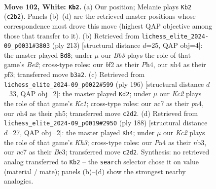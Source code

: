\documentclass[11pt]{article}
\begin{document}
\clearpage

\begin{figure}[p]\centering
\begin{subfigure}{0.46\textwidth}\centering
\resizebox{\linewidth}{!}{%
\newchessgame
\chessboard[
  setfen={8/1Nn3k1/8/8/Pp2P2n/1B6/2K1pb1p/8 w - - 0 102},
  showmover=false,
  pgfstyle=straightmove, color=movearrow, markmove={c2-b2}
]}
\caption{}
\end{subfigure}\hfill
\begin{subfigure}{0.46\textwidth}\centering
\resizebox{\linewidth}{!}{%
\newchessgame
\chessboard[
  setfen={8/4b3/3k4/p3p3/P3P2p/3N1P2/8/6K1 b - - 17 107},
  showmover=false,
  pgfstyle=straightmove, color=movearrow, markmove={e7-d8}
]}
\caption{}
\end{subfigure}
\\[4pt]
\begin{subfigure}{0.46\textwidth}\centering
\resizebox{\linewidth}{!}{%
\newchessgame
\chessboard[
  setfen={8/4B3/b7/3k3p/p6P/P2p4/8/2K5 w - - 28 99},
  showmover=false,
  pgfstyle=straightmove, color=movearrow, markmove={c1-d2}
]}
\caption{}
\end{subfigure}\hfill
\begin{subfigure}{0.46\textwidth}\centering
\resizebox{\linewidth}{!}{%
\newchessgame
\chessboard[
  setfen={5k2/8/7p/5p2/2P1nP2/1n2B2K/8/8 w - - 0 95},
  showmover=false,
  pgfstyle=straightmove, color=movearrow, markmove={h3-h4}
]}
\caption{}
\end{subfigure}
\caption{\textbf{Move 102, White: \texttt{Kb2}.} (a) Our position; Melanie plays \texttt{Kb2} (\texttt{c2b2}). Panels (b)--(d) are the retrieved master positions whose correspondence most drove this move (highest QAP objective among those that transfer to it). (b) Retrieved from \texttt{lichess\_elite\_2024-09\_p0031\#3803} (ply 213) [structural distance $d$=25, QAP obj=4]: the master played \texttt{Bd8}; under $\mu$ our \emph{Bb3} plays the role of that game's \emph{Be2}; cross-type roles: our \emph{b}f2 as their \emph{P}h4, our \emph{n}h4 as their \emph{p}f3; transferred move \texttt{b3a2}. (c) Retrieved from \texttt{lichess\_elite\_2024-09\_p0022\#599} (ply 196) [structural distance $d$=33, QAP obj=2]: the master played \texttt{Kd2}; under $\mu$ our \emph{Kc2} plays the role of that game's \emph{Kc1}; cross-type roles: our \emph{n}c7 as their \emph{p}a4, our \emph{n}h4 as their \emph{p}h5; transferred move \texttt{c2d2}. (d) Retrieved from \texttt{lichess\_elite\_2024-09\_p0019\#2950} (ply 188) [structural distance $d$=27, QAP obj=2]: the master played \texttt{Kh4}; under $\mu$ our \emph{Kc2} plays the role of that game's \emph{Kh3}; cross-type roles: our \emph{P}a4 as their \emph{n}b3, our \emph{n}c7 as their \emph{B}e3; transferred move \texttt{c2d2}. Synthesis: no retrieved analog transferred to \texttt{Kb2} -- the \texttt{search} selector chose it on value (material / mate); panels (b)--(d) show the strongest nearby analogies.}
\label{fig:thought-m202}
\end{figure}
\end{document}
